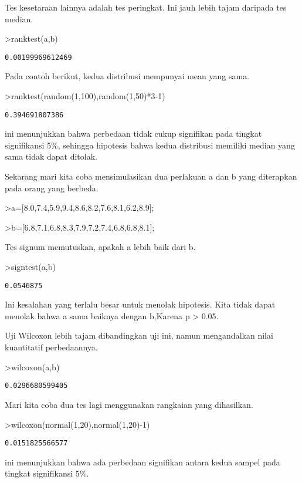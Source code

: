 \documentclass[
]{book}
\begin{document}
Tes kesetaraan lainnya adalah tes peringkat. Ini jauh lebih tajam daripada tes median.

\textgreater ranktest(a,b)

\begin{verbatim}
0.00199969612469
\end{verbatim}

Pada contoh berikut, kedua distribusi mempunyai mean yang sama.

\textgreater ranktest(random(1,100),random(1,50)*3-1)

\begin{verbatim}
0.394691807386
\end{verbatim}

ini menunjukkan bahwa perbedaan tidak cukup signifikan pada tingkat signifikansi 5\%, sehingga hipotesis bahwa kedua distribusi memiliki median yang sama tidak dapat ditolak.

Sekarang mari kita coba mensimulasikan dua perlakuan a dan b yang diterapkan pada orang yang berbeda.

\textgreater a={[}8.0,7.4,5.9,9.4,8.6,8.2,7.6,8.1,6.2,8.9{]};

\textgreater b={[}6.8,7.1,6.8,8.3,7.9,7.2,7.4,6.8,6.8,8.1{]};

Tes signum memutuskan, apakah a lebih baik dari b.

\textgreater signtest(a,b)

\begin{verbatim}
0.0546875
\end{verbatim}

Ini kesalahan yang terlalu besar untuk menolak hipotesis. Kita tidak dapat menolak bahwa a sama baiknya dengan b,Karena p \textgreater{} 0.05.

Uji Wilcoxon lebih tajam dibandingkan uji ini, namun mengandalkan nilai kuantitatif perbedaannya.

\textgreater wilcoxon(a,b)

\begin{verbatim}
0.0296680599405
\end{verbatim}

Mari kita coba dua tes lagi menggunakan rangkaian yang dihasilkan.

\textgreater wilcoxon(normal(1,20),normal(1,20)-1)

\begin{verbatim}
0.0151825566577
\end{verbatim}

ini menunjukkan bahwa ada perbedaan signifikan antara kedua sampel pada tingkat signifikansi 5\%.
\end{document}
